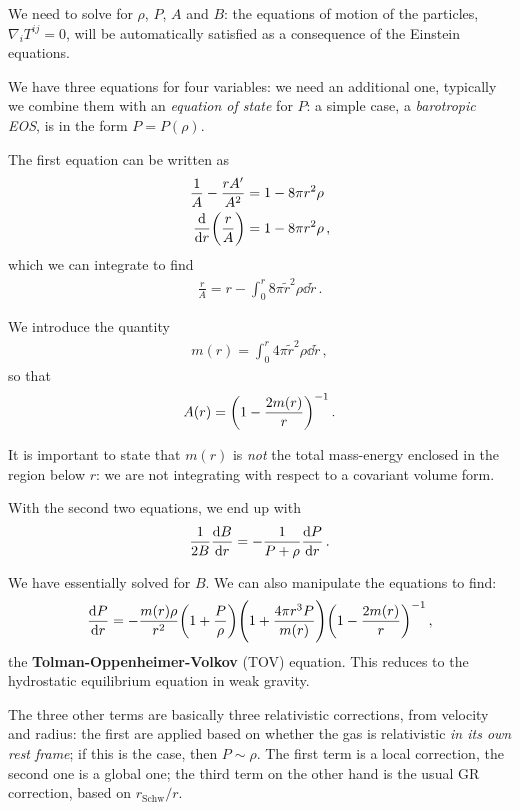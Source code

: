 \documentclass[main.tex]{subfiles}
\begin{document}
We need to solve for \(\rho \), \(P\), \(A\) and \(B\): the equations of motion of the particles, \(\nabla_{i} T^{ij} = 0\), will be automatically satisfied as a consequence of the Einstein equations. 

We have three equations for four variables: we need an additional one, typically we combine them with an \emph{equation of state} for \(P\): a simple case, a \emph{barotropic EOS}, is in the form \(P = P(\rho )\).

The first equation can be written as 
%
\begin{align}
\frac{1}{A} - \frac{r A'}{A^2} &= 1 - 8 \pi r^2 \rho  \\
\dv{r}( \frac{r}{A}) &= 1 - 8 \pi r^2 \rho 
\,,
\end{align}
%
which we can integrate to find 
%
\begin{align}
\frac{r}{A} = r - \int_{0}^{r} 8 \pi \widetilde{r}^2\rho \dd{\widetilde{r}}
\,.
\end{align}

We introduce the quantity 
%
\begin{align}
m(r) = \int_{0}^{r} 4 \pi \widetilde{r}^2 \rho \dd{\widetilde{r}}
\,,
\end{align}
%
so that
%
\begin{align}
A(r) = \qty(1 - \frac{2 m(r)}{r})^{-1}
\,.
\end{align}

It is important to state that \(m(r)\) is \emph{not} the total mass-energy enclosed in the region below \(r\): we are not integrating with respect to a covariant volume form.

With the second two equations, we end up with 
%
\begin{align}
\frac{1}{2B} \dv{B}{r} = - \frac{1}{P + \rho } \dv{P}{r}
\,.
\end{align}

We have essentially solved for \(B\). 
We can also manipulate the equations to find:
%
\begin{align}
\dv{P}{r} = - \frac{m(r) \rho }{r^2} \qty(1 + \frac{P}{\rho })
\qty(1 + \frac{4 \pi r^3 P}{m(r)}) \qty(1 - \frac{2 m(r)}{r})^{-1}
\,,
\end{align}
%
the \textbf{Tolman-Oppenheimer-Volkov} (TOV) equation. 
This reduces to the hydrostatic equilibrium equation in weak gravity.

The three other terms are basically three relativistic corrections, from velocity and radius: the first are applied based on whether the gas is relativistic \emph{in its own rest frame}; if this is the case, then \(P \sim \rho \).
The first term is a local correction, the second one is a global one; the third term on the other hand is the usual GR correction, based on \(r _{\text{Schw}} / r\). 
\end{document}
